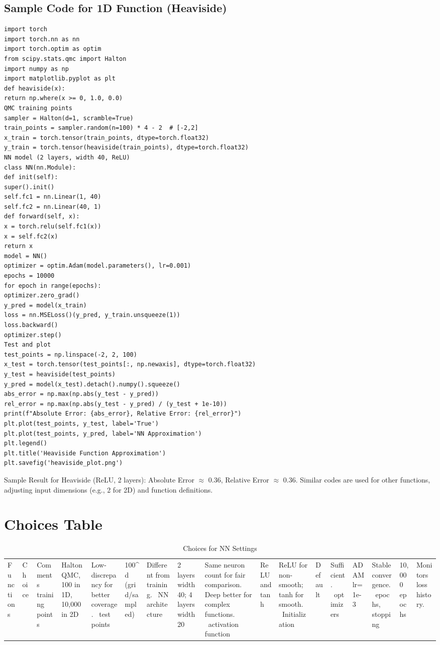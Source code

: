 \documentclass[a4paper,12pt]{article}
\begin{document}
\subsection{Sample Code for 1D Function (Heaviside)}
\lstset{language=Python}
\begin{lstlisting}
import torch
import torch.nn as nn
import torch.optim as optim
from scipy.stats.qmc import Halton
import numpy as np
import matplotlib.pyplot as plt
def heaviside(x):
return np.where(x >= 0, 1.0, 0.0)
QMC training points
sampler = Halton(d=1, scramble=True)
train_points = sampler.random(n=100) * 4 - 2  # [-2,2]
x_train = torch.tensor(train_points, dtype=torch.float32)
y_train = torch.tensor(heaviside(train_points), dtype=torch.float32)
NN model (2 layers, width 40, ReLU)
class NN(nn.Module):
def init(self):
super().init()
self.fc1 = nn.Linear(1, 40)
self.fc2 = nn.Linear(40, 1)
def forward(self, x):
x = torch.relu(self.fc1(x))
x = self.fc2(x)
return x
model = NN()
optimizer = optim.Adam(model.parameters(), lr=0.001)
epochs = 10000
for epoch in range(epochs):
optimizer.zero_grad()
y_pred = model(x_train)
loss = nn.MSELoss()(y_pred, y_train.unsqueeze(1))
loss.backward()
optimizer.step()
Test and plot
test_points = np.linspace(-2, 2, 100)
x_test = torch.tensor(test_points[:, np.newaxis], dtype=torch.float32)
y_test = heaviside(test_points)
y_pred = model(x_test).detach().numpy().squeeze()
abs_error = np.max(np.abs(y_test - y_pred))
rel_error = np.max(np.abs(y_test - y_pred) / (y_test + 1e-10))
print(f"Absolute Error: {abs_error}, Relative Error: {rel_error}")
plt.plot(test_points, y_test, label='True')
plt.plot(test_points, y_pred, label='NN Approximation')
plt.legend()
plt.title('Heaviside Function Approximation')
plt.savefig('heaviside_plot.png')
\end{lstlisting}
Sample Result for Heaviside (ReLU, 2 layers): Absolute Error $≈$ 0.36, Relative Error $≈$ 0.36.
Similar codes are used for other functions, adjusting input dimensions (e.g., 2 for 2D) and function definitions.

\section{Choices Table}
\begin{table}[h]
\centering
\begin{tabular}{|l|l|l|}
\hline
Functions & Choice & Comments \
\hline
training points & Halton QMC, 100 in 1D, 10,000 in 2D & Low-discrepancy for better coverage. \
test points & 100^d (grid/sampled) & Different from training. \
NN architecture & 2 layers width 40; 4 layers width 20 & Same neuron count for fair comparison. Deep better for complex functions. \
activation function & ReLU and tanh & ReLU for non-smooth; tanh for smooth. \
Initialization & Default & Sufficient. \
optimizers & ADAM lr=1e-3 & Stable convergence. \
epochs, stopping & 10,000 epochs & Monitors loss history. \
\hline
\end{tabular}
\caption{Choices for NN Settings}
\end{table}
\end{document}
